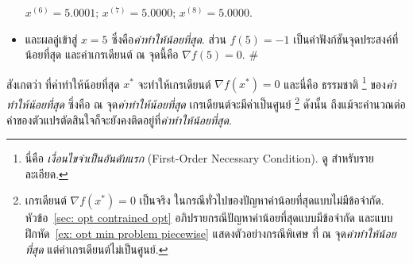 \begin{itemize}
$x^{(6)} = 5.0001$;
$x^{(7)} = 5.0000$;
$x^{(8)} = 5.0000$.
%		
		\item และผลลู่เข้าสู่ $x = 5$ ซึ่งคือ\textit{ค่าทำให้น้อยที่สุด}.
		ส่วน $f(5) = -1$ เป็นค่าฟังก์ชันจุดประสงค์ที่น้อยที่สุด 
		และค่าเกรเดียนต์ ณ จุดนี้คือ $\nabla f(5) = 0$.
	\hfill $\#$%
	\end{itemize}
%	
สังเกตว่า ที่ค่าทำให้น้อยที่สุด $x^\ast$ จะทำให้เกรเดียนต์ $\nabla f(x^\ast) = 0$
และนี่คือ ธรรมชาติ%
\footnote{%
	นี่คือ \textit{เงื่อนไขจำเป็นอันดับแรก} (First-Order Necessary Condition).
	ดู \cite{ChongZak2ndEd} สำหรับรายละเอียด.
}
ของ\textit{ค่าทำให้น้อยที่สุด}
ซึ่งคือ
ณ จุด\textit{ค่าทำให้น้อยที่สุด}
เกรเดียนต์จะมีค่าเป็นศูนย์%
\footnote{%
เกรเดียนต์ $\nabla f(x^\ast) = 0$
เป็นจริง 
ในกรณีทั่วไปของปัญหาค่าน้อยที่สุดแบบไม่มีข้อจำกัด.
หัวข้อ~\ref{sec: opt contrained opt} อภิปรายกรณีปัญหาค่าน้อยที่สุดแบบมีข้อจำกัด
และแบบฝึกหัด~\ref{ex: opt min problem piecewise} แสดงตัวอย่างกรณีพิเศษ
ที่  
ณ จุด\textit{ค่าทำให้น้อยที่สุด}
แต่ค่าเกรเดียนต์ไม่เป็นศูนย์.
}
ดังนั้น ถึงแม้จะคำนวณต่อ
ค่าของตัวแปรตัดสินใจก็จะยังคงติดอยู่ที่\textit{ค่าทำให้น้อยที่สุด}.

